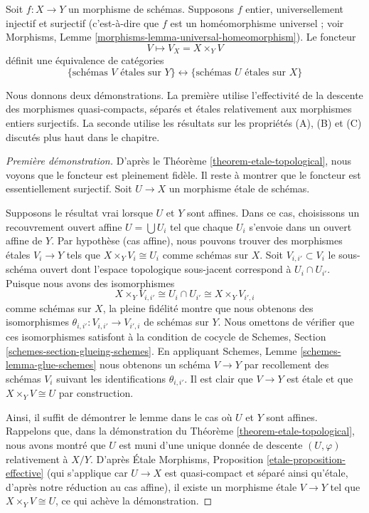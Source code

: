 \begin{theorem}
\label{theorem-topological-invariance}
\begin{reference}
\cite[IV Theorem 18.1.2]{EGA}
\end{reference}
Soit $f : X \to Y$ un morphisme de sch\'emas.
Supposons $f$ entier, universellement injectif et surjectif
(c'est-\`a-dire que $f$ est un hom\'eomorphisme universel ; voir
Morphisms, Lemme \ref{morphisms-lemma-universal-homeomorphism}).
Le foncteur
$$
V \longmapsto V_X = X \times_Y V
$$
d\'efinit une \'equivalence de cat\'egories
$$
\{
\text{sch\'emas }V\text{ \'etales sur }Y
\}
\leftrightarrow
\{
\text{sch\'emas }U\text{ \'etales sur }X
\}
$$
\end{theorem}

\noindent
Nous donnons deux d\'emonstrations. La premi\`ere utilise l'effectivit\'e de la descente
des morphismes quasi-compacts, s\'epar\'es et \'etales relativement
aux morphismes entiers surjectifs. La seconde utilise les r\'esultats
sur les propri\'et\'es (A), (B) et (C) discut\'es plus haut dans le chapitre.

\begin{proof}[Premi\`ere d\'emonstration]
D'apr\`es le Th\'eor\`eme \ref{theorem-etale-topological},
nous voyons que le foncteur est pleinement fid\`ele.
Il reste \`a montrer que le foncteur est essentiellement surjectif.
Soit $U \to X$ un morphisme \'etale de sch\'emas.

\medskip\noindent
Supposons le r\'esultat vrai lorsque $U$ et $Y$ sont affines.
Dans ce cas, choisissons un recouvrement ouvert affine
$U = \bigcup U_i$ tel que chaque $U_i$ s'envoie
dans un ouvert affine de $Y$. Par hypoth\`ese (cas affine), nous pouvons
trouver des morphismes \'etales $V_i \to Y$ tels que $X \times_Y V_i \cong U_i$
comme sch\'emas sur $X$. Soit $V_{i, i'} \subset V_i$
le sous-sch\'ema ouvert dont l'espace topologique sous-jacent
correspond \`a $U_i \cap U_{i'}$. Puisque nous avons des isomorphismes
$$
X \times_Y V_{i, i'} \cong U_i \cap U_{i'} \cong X \times_Y V_{i', i}
$$
comme sch\'emas sur $X$, la pleine fid\'elit\'e montre que nous
obtenons des isomorphismes
$\theta_{i, i'} : V_{i, i'} \to V_{i', i}$ de sch\'emas sur $Y$.
Nous omettons de v\'erifier que ces isomorphismes satisfont \`a la
condition de cocycle de Schemes, Section \ref{schemes-section-glueing-schemes}.
En appliquant Schemes, Lemme \ref{schemes-lemma-glue-schemes}
nous obtenons un sch\'ema $V \to Y$ par
recollement des sch\'emas $V_i$ suivant les identifications $\theta_{i, i'}$.
Il est clair que $V \to Y$ est \'etale et que $X \times_Y V \cong U$
par construction.

\medskip\noindent
Ainsi, il suffit de d\'emontrer le lemme dans le cas o\`u $U$ et $Y$ sont affines.
Rappelons que, dans la d\'emonstration du Th\'eor\`eme \ref{theorem-etale-topological},
nous avons montr\'e que $U$ est muni d'une unique donn\'ee de descente
$(U, \varphi)$ relativement \`a $X/Y$. D'apr\`es
\'Etale Morphisms, Proposition \ref{etale-proposition-effective}
(qui s'applique car $U \to X$ est quasi-compact et s\'epar\'e
ainsi qu'\'etale, d'apr\`es notre r\'eduction au cas affine),
il existe un morphisme \'etale $V \to Y$ tel que
$X \times_Y V \cong U$, ce qui ach\`eve la d\'emonstration.
\end{proof}


